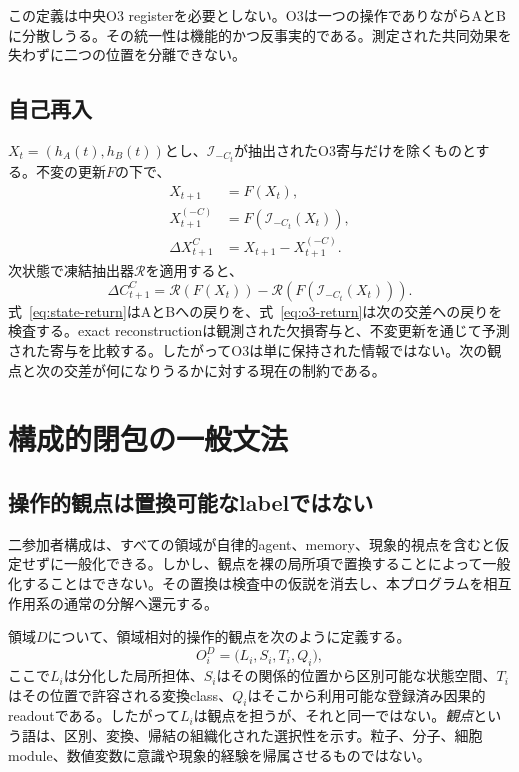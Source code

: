 \documentclass[11pt,a4paper]{article}
\begin{document}
この定義は中央O3 registerを必要としない。O3は一つの操作でありながらAとBに分散しうる。その統一性は機能的かつ反事実的である。測定された共同効果を失わずに二つの位置を分離できない。

\subsection{自己再入}

$X_t=(h_A(t),h_B(t))$とし、$\mathcal I_{-C_t}$が抽出されたO3寄与だけを除くものとする。不変の更新$F$の下で、
\begin{align}
 X_{t+1}&=F(X_t),\\
 X_{t+1}^{(-C)}&=F(\mathcal I_{-C_t}(X_t)),\\
 \Delta X_{t+1}^{C}&=X_{t+1}-X_{t+1}^{(-C)}.
 \label{eq:state-return}
\end{align}
次状態で凍結抽出器$\mathcal R$を適用すると、
\begin{equation}
 \Delta C_{t+1}^{C}
 =\mathcal R(F(X_t))-\mathcal R(F(\mathcal I_{-C_t}(X_t))).
 \label{eq:o3-return}
\end{equation}
式~\eqref{eq:state-return}はAとBへの戻りを、式~\eqref{eq:o3-return}は次の交差への戻りを検査する。exact reconstructionは観測された欠損寄与と、不変更新を通じて予測された寄与を比較する。したがってO3は単に保持された情報ではない。次の観点と次の交差が何になりうるかに対する現在の制約である。

\section{構成的閉包の一般文法}

\subsection{操作的観点は置換可能なlabelではない}

二参加者構成は、すべての領域が自律的agent、memory、現象的視点を含むと仮定せずに一般化できる。しかし、観点を裸の局所項で置換することによって一般化することはできない。その置換は検査中の仮説を消去し、本プログラムを相互作用系の通常の分解へ還元する。

領域$D$について、領域相対的操作的観点を次のように定義する。
\begin{equation}
 O_i^D=\bigl(L_i,S_i,T_i,Q_i\bigr),
 \label{eq:domain-perspective}
\end{equation}
ここで$L_i$は分化した局所担体、$S_i$はその関係的位置から区別可能な状態空間、$T_i$はその位置で許容される変換class、$Q_i$はそこから利用可能な登録済み因果的readoutである。したがって$L_i$は観点を担うが、それと同一ではない。\emph{観点}という語は、区別、変換、帰結の組織化された選択性を示す。粒子、分子、細胞module、数値変数に意識や現象的経験を帰属させるものではない。
\end{document}
